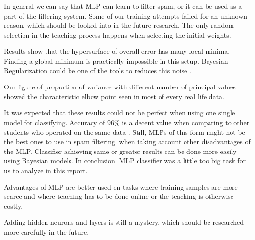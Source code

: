 In general we can say that MLP can learn to filter spam, or it can be used as a part of the filtering system. Some of our training attempts failed for an unknown reason, which should be looked into in the future research. The only random selection in the teaching process happens when selecting the initial weights.

Results show that the hypersurface of overall error has many local minima.  Finding a global minimum is practically impossible in this setup. Bayesian Regularization could be one of the tools to reduces this noise \cite{crsouza} .

Our figure of proportion of variance with different number of principal values showed the characteristic elbow point seen in most of every real life data.

It was expected that these results could not be perfect when using one single model for classifying. Accuracy of 96\% is a decent value when comparing to other students who operated on the same data  \cite{datachallenge} . Still, MLPs of this form might not be the best ones to use in spam filtering, when taking account other disadvantages of the MLP. Classifier achieving same or greater results can be done more easily using Bayesian models. In conclusion, MLP classifier was a little too big task for us to analyze in this report.

Advantages of MLP are better used on tasks where training samples are more scarce and where teaching has to be done online or the teaching is otherwise costly.

Adding hidden neurons and layers is still a mystery, which should be researched more carefully in the future.







